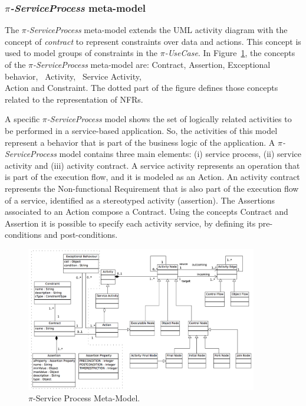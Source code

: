 \subsubsection{\textit{$\pi$-ServiceProcess} meta-model}%

The \textit{$\pi$-ServiceProcess} meta-model extends the UML activity diagram with the concept of \textit{contract} to represent constraints over data and actions. This concept is used to model 
groups  of  constraints  in the \textit{$\pi$-UseCase}. 
In Figure~\ref{fig:CIM:serviceprocessmetamodel}, the concepts of the \textit{$\pi$-Ser\-vice\-Process} meta-model are: {\sc Contract}, {\sc Assertion}, {\sc Exceptional behavior}, \ {\sc Activity}, \ {\sc Ser\-vice Acti\-vi\-ty}, \\ {\sc Action} and {\sc Constraint}.
The dotted part of the figure defines those concepts related to the representation of NFRs.

A specific \textit{$\pi$-ServiceProcess} model shows the set of logically related activities to be performed in a service-based application. 
So, the activities of this model represent a behavior that is part of the business logic of the application. 
A \textit{$\pi$-ServiceProcess}  model contains three main elements: (i) service process, (ii) service activity and (iii) activity contract. A service activity represents an operation that is part of the execution flow, and it is modeled as an {\sc Action}. 
An activity contract represents the {\sc Non-functional Requirement}  that is also part of the execution flow of a service, identified  as a stereotyped activity ({\sf assertion}). 
The {\sc Assertion}s associated to an {\sc Action} compose a {\sc Contract}. Using the concepts {\sc Contract} and {\sc Assertion} it is possible to specify each activity service, by defining its pre-conditions and post-conditions.

\begin{figure}
\center
\includegraphics[width=0.9\textwidth]{figs/ServiceProcessMetaModel.pdf}
\caption{\label{fig:CIM:serviceprocessmetamodel} $\pi$-Service Process Meta-Model.}
\end{figure}

